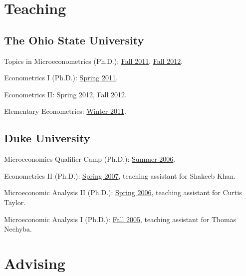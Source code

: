 \documentclass[10pt,letterpaper]{article}
\renewenvironment{itemize}{
  \begin{list}{}{
    \setlength{\leftmargin}{1.5em}
    \setlength{\itemsep}{0.25em}
    \setlength{\parskip}{0pt}
    \setlength{\parsep}{0.25em}
  }
}{
  \end{list}
}
\begin{document}
\section*{Teaching}

\subsection*{The Ohio State University}

\begin{itemize}
\item Topics in Microeconometrics (Ph.D.):
  \href{http://jblevins.org/courses/econ843f11/}{Fall 2011}, %
  \href{http://jblevins.org/courses/econ8833f12/}{Fall 2012}. %
\item Econometrics I (Ph.D.):
  \href{http://jblevins.org/courses/econ741s11/}{Spring 2011}. %
\item Econometrics II:
  Spring 2012, %
  Fall 2012. %
\item Elementary Econometrics:
  \href{http://jblevins.org/courses/econ444w11/}{Winter 2011}. %
\end{itemize}

\subsection*{Duke University}

\begin{itemize}
\item Microeconomics Qualifier Camp (Ph.D.):
  \href{http://jblevins.org/courses/qualcamp06/}{Summer 2006}.
\item Econometrics II (Ph.D.):
  \href{http://jblevins.org/courses/econ342s07/}{Spring 2007}, teaching assistant for Shakeeb Khan.
\item Microeconomic Analysis II (Ph.D.):
  \href{http://jblevins.org/courses/econ302s06/}{Spring 2006}, teaching assistant for Curtis Taylor.
\item Microeconomic Analysis I (Ph.D.):
  \href{http://jblevins.org/courses/econ301f05/}{Fall 2005}, teaching assistant for Thomas Nechyba.
\end{itemize}

\section*{Advising}
\end{document}

